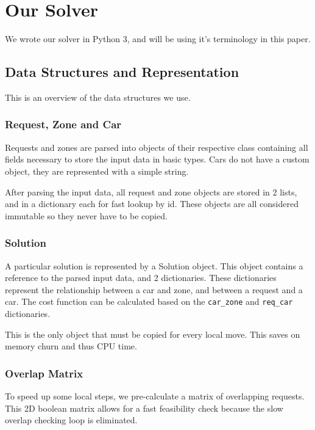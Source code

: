\documentclass[11pt,a4paper]{article}
\begin{document}
\section{Our Solver}

    We wrote our solver in Python 3, and will be using it's terminology in this paper.

    \subsection{Data Structures and Representation}

        This is an overview of the data structures we use.

        \subsubsection{Request, Zone and Car}
            Requests and zones are parsed into objects of their respective class containing all fields necessary to store the input data in basic types.
            Cars do not have a custom object, they are represented with a simple string.

            After parsing the input data, all request and zone objects are stored in 2 lists, and in a dictionary each for fast lookup by id.
            These objects are all considered immutable so they never have to be copied.
        
        \subsubsection{Solution}
            A particular solution is represented by a Solution object.
            This object contains a reference to the parsed input data, and 2 dictionaries.
            These dictionaries represent the relationship between a car and zone, and between a request and a car.
            The cost function can be calculated based on the \texttt{car\_zone} and \texttt{req\_car} dictionaries.

            This is the only object that must be copied for every local move.
            This saves on memory churn and thus CPU time.

        \subsubsection{Overlap Matrix}
            To speed up some local steps, we pre-calculate a matrix of overlapping requests.
            This 2D boolean matrix allows for a fast feasibility check because the slow overlap checking loop is eliminated.
\end{document}
